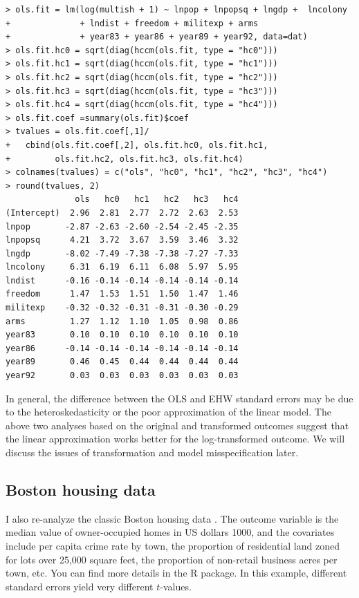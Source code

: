 \begin{lstlisting}
> ols.fit = lm(log(multish + 1) ~ lnpop + lnpopsq + lngdp +  lncolony 
+              + lndist + freedom + militexp + arms 
+              + year83 + year86 + year89 + year92, data=dat)
> ols.fit.hc0 = sqrt(diag(hccm(ols.fit, type = "hc0")))
> ols.fit.hc1 = sqrt(diag(hccm(ols.fit, type = "hc1")))
> ols.fit.hc2 = sqrt(diag(hccm(ols.fit, type = "hc2")))
> ols.fit.hc3 = sqrt(diag(hccm(ols.fit, type = "hc3")))
> ols.fit.hc4 = sqrt(diag(hccm(ols.fit, type = "hc4")))
> ols.fit.coef =summary(ols.fit)$coef
> tvalues = ols.fit.coef[,1]/
+   cbind(ols.fit.coef[,2], ols.fit.hc0, ols.fit.hc1, 
+         ols.fit.hc2, ols.fit.hc3, ols.fit.hc4)
> colnames(tvalues) = c("ols", "hc0", "hc1", "hc2", "hc3", "hc4")
> round(tvalues, 2)
              ols   hc0   hc1   hc2   hc3   hc4
(Intercept)  2.96  2.81  2.77  2.72  2.63  2.53
lnpop       -2.87 -2.63 -2.60 -2.54 -2.45 -2.35
lnpopsq      4.21  3.72  3.67  3.59  3.46  3.32
lngdp       -8.02 -7.49 -7.38 -7.38 -7.27 -7.33
lncolony     6.31  6.19  6.11  6.08  5.97  5.95
lndist      -0.16 -0.14 -0.14 -0.14 -0.14 -0.14
freedom      1.47  1.53  1.51  1.50  1.47  1.46
militexp    -0.32 -0.32 -0.31 -0.31 -0.30 -0.29
arms         1.27  1.12  1.10  1.05  0.98  0.86
year83       0.10  0.10  0.10  0.10  0.10  0.10
year86      -0.14 -0.14 -0.14 -0.14 -0.14 -0.14
year89       0.46  0.45  0.44  0.44  0.44  0.44
year92       0.03  0.03  0.03  0.03  0.03  0.03
\end{lstlisting}


  In general, the difference between the OLS and EHW standard errors may be due to the heteroskedasticity or the poor approximation of the linear model. The above two analyses based on the original and transformed outcomes suggest that the linear approximation works better for the log-transformed outcome. 
  We will discuss the issues of transformation and model misspecification later. 


\subsection{Boston housing data}


I also re-analyze the classic Boston housing data \citep{harrison1978hedonic}. The outcome variable is the median value of owner-occupied homes in US dollars 1000, and the covariates include per capita crime rate by town, the proportion of residential land zoned for lots over 25,000 square feet, the proportion of non-retail business acres per town, etc. You can find more details in the R package. In this example, different standard errors yield very different $t$-values. 


